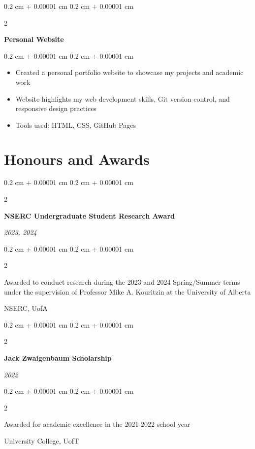 \documentclass[10pt, letterpaper]{article}
\newenvironment{highlights}{
    \begin{itemize}[
        topsep=0.10 cm,
        parsep=0.10 cm,
        partopsep=0pt,
        itemsep=0pt,
        leftmargin=0.4 cm + 10pt
    ]
}{
    \end{itemize}
} %
\newenvironment{onecolentry}{
    \begin{adjustwidth}{
        0.2 cm + 0.00001 cm
    }{
        0.2 cm + 0.00001 cm
    }
}{
    \end{adjustwidth}
} %
\newenvironment{twocolentry}[2][]{
    \onecolentry
    \def\secondColumn{#2}
    \setcolumnwidth{\fill, 4.5 cm}
    \begin{paracol}{2}
}{
    \switchcolumn \raggedleft \secondColumn
    \end{paracol}
    \endonecolentry
} %
\let\hrefWithoutArrow\href
\renewcommand{\href}[2]{\hrefWithoutArrow{#1}{\ifthenelse{\equal{#2}{}}{ }{#2 }\raisebox{.15ex}{\footnotesize \faExternalLink*}}}
\begin{document}
        \vspace{0.2cm}




        \begin{twocolentry}
            {\textit{\href{https://ianzhang42.github.io/}{link}}}
            \textbf{Personal Website}
        \end{twocolentry}
        \begin{onecolentry}
            \begin{highlights}
                \item Created a personal portfolio website to showcase my projects and academic work
                \item Website highlights my web development skills, Git version control, and responsive design practices
                \item Tools used: HTML, CSS, GitHub Pages
            \end{highlights}
        \end{onecolentry}




     \vspace{0.2 cm}

    \section{Honours and Awards}





    \begin{twocolentry}{   
            
        \textit{2023, 2024}}
            \textbf{NSERC Undergraduate Student Research Award}
        \end{twocolentry}

        \vspace{0.10 cm}
    \begin{twocolentry}{      NSERC, UofA}
        Awarded to conduct research during the 2023 and 2024 Spring/Summer terms under the supervision of Professor Mike A. Kouritzin at the University of Alberta
    \end{twocolentry}

    \vspace{0.2cm}

    \begin{twocolentry}
       { \textit{2022}}
        \textbf{Jack Zwaigenbaum Scholarship}
    \end{twocolentry}
    \vspace{0.1cm}
    \begin{twocolentry}
        {University College, UofT}
        Awarded for academic excellence in the 2021-2022 school year
    \end{twocolentry}
\end{document}
